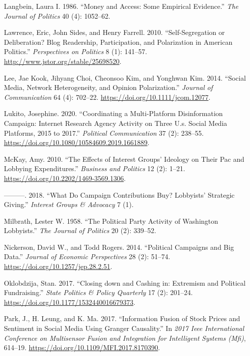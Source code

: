 \documentclass[12pt,]{article}
\begin{document}
\leavevmode\hypertarget{ref-langbein1986}{}%
Langbein, Laura I. 1986. ``Money and Access: Some Empirical Evidence.''
\emph{The Journal of Politics} 40 (4): 1052--62.

\leavevmode\hypertarget{ref-lawrence2010}{}%
Lawrence, Eric, John Sides, and Henry Farrell. 2010. ``Self-Segregation
or Deliberation? Blog Readership, Participation, and Polarization in
American Politics.'' \emph{Perspectives on Politics} 8 (1): 141--57.
\url{http://www.jstor.org/stable/25698520}.

\leavevmode\hypertarget{ref-lee2014}{}%
Lee, Jae Kook, Jihyang Choi, Cheonsoo Kim, and Yonghwan Kim. 2014.
``Social Media, Network Heterogeneity, and Opinion Polarization.''
\emph{Journal of Communication} 64 (4): 702--22.
\url{https://doi.org/10.1111/jcom.12077}.

\leavevmode\hypertarget{ref-lukito2020}{}%
Lukito, Josephine. 2020. ``Coordinating a Multi-Platform Disinformation
Campaign: Internet Research Agency Activity on Three U.s. Social Media
Platforms, 2015 to 2017.'' \emph{Political Communication} 37 (2):
238--55. \url{https://doi.org/10.1080/10584609.2019.1661889}.

\leavevmode\hypertarget{ref-mckay2010}{}%
McKay, Amy. 2010. ``The Effects of Interest Groups' Ideology on Their
Pac and Lobbying Expenditures.'' \emph{Business and Politics} 12 (2):
1--21. \url{https://doi.org/10.2202/1469-3569.1306}.

\leavevmode\hypertarget{ref-mckay2018}{}%
---------. 2018. ``What Do Campaign Contributions Buy? Lobbyists'
Strategic Giving.'' \emph{Interest Groups \& Advocacy} 7 (1).

\leavevmode\hypertarget{ref-milbrath1958}{}%
Milbrath, Lester W. 1958. ``The Political Party Activity of Washington
Lobbyists.'' \emph{The Journal of Politics} 20 (2): 339--52.

\leavevmode\hypertarget{ref-nickerson2014}{}%
Nickerson, David W., and Todd Rogers. 2014. ``Political Campaigns and
Big Data.'' \emph{Journal of Economic Perspectives} 28 (2): 51--74.
\url{https://doi.org/10.1257/jep.28.2.51}.

\leavevmode\hypertarget{ref-oklobdzija2017}{}%
Oklobdzija, Stan. 2017. ``Closing down and Cashing in: Extremism and
Political Fundraising.'' \emph{State Politics \& Policy Quarterly} 17
(2): 201--24. \url{https://doi.org/10.1177/1532440016679373}.

\leavevmode\hypertarget{ref-park2017}{}%
Park, J., H. Leung, and K. Ma. 2017. ``Information Fusion of Stock
Prices and Sentiment in Social Media Using Granger Causality.'' In
\emph{2017 Ieee International Conference on Multisensor Fusion and
Integration for Intelligent Systems (Mfi)}, 614--19.
\url{https://doi.org/10.1109/MFI.2017.8170390}.
\end{document}
